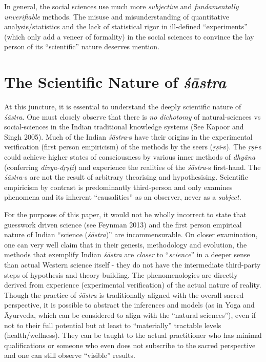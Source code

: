 In general, the social sciences use much more {\sl subjective} and {\sl fundamentally unverifiable} methods. The misuse and misunderstanding of quantitative analysis/statistics and the lack of statistical rigor in ill-defined ``experiments'' (which only add a veneer of formality) in the social sciences to convince the lay person of its ``scientific'' nature deserves mention.

\section*{The Scientific Nature of {\sl\bfseries śāstra}}

At this juncture, it is essential to understand the deeply scientific nature of {\sl śāstra}. One must closely observe that there is {\sl no dichotomy} of natural-sciences vs social-sciences in the Indian traditional knowledge systems (See Kapoor and Singh 2005). Much of the Indian \hbox{{\sl śāstra}-s} have their origins in the experimental verification (first person empiricism) of the methods by the seers ({\sl ṛṣi}-s). The {\sl ṛṣi}-s could achieve higher states of consciousness by various inner methods of {\sl dhyāna} (conferring {\sl divya-dṛṣṭi}) and experience the realities of the {\sl śāstra}-s first-hand. The {\sl śāstra}-s are not the result of arbitrary theorising and hypothesising. Scientific empiricism by contrast is predominantly third-person and only examines phenomena and its inherent ``causalities'' as an observer, never as a {\sl subject}.

For the purposes of this paper, it would not be wholly incorrect to state that guesswork driven science (see Feynman 2013) and the first person empirical nature of Indian ``science ({\sl śāstra})'' are incommensurable. On closer examination, one can very well claim that in their genesis, methodology and  evolution, the methods that exemplify  Indian  {\sl śāstra} are {\sl closer} to ``{\sl science}'' in a deeper sense than actual Western science itself - they do not have the intermediate third-party steps of hypothesis and theory-building. The phenomenologies are directly derived from experience (experimental verification) of the actual nature of reality. Though the practice of {\sl śāstra} is traditionally aligned with the overall sacred perspective, it is possible to abstract the inferences and models (as in Yoga and Āyurveda, which can be considered to align with the ``natural sciences''), even if not to their full potential but at least to ``materially'' tractable levels (health/wellness). They can be taught to the actual practitioner who has minimal qualifications or someone who even does not subscribe to the sacred perspective and one can still observe ``visible'' results.

